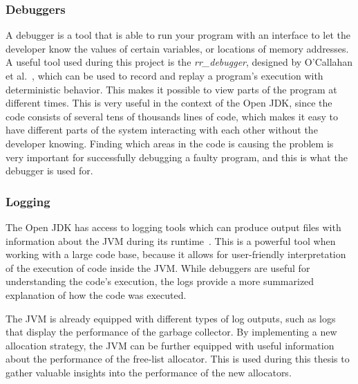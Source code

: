 \subsubsection{Debuggers}
A debugger is a tool that is able to run your program with an interface to let the developer know the values of certain variables, or locations of memory addresses. A useful tool used during this project is the \textit{rr\_debugger}, designed by O'Callahan et al.~\cite{rrdebugger}, which can be used to record and replay a program's execution with deterministic behavior. This makes it possible to view parts of the program at different times. This is very useful in the context of the Open JDK, since the code consists of several tens of thousands lines of code, which makes it easy to have different parts of the system interacting with each other without the developer knowing. Finding which areas in the code is causing the problem is very important for successfully debugging a faulty program, and this is what the debugger is used for.

\subsubsection{Logging}
The Open JDK has access to logging tools which can produce output files with information about the JVM during its runtime~\cite{https://inside.java/2022/11/07/sip071/}. This is a powerful tool when working with a large code base, because it allows for user-friendly interpretation of the execution of code inside the JVM. While debuggers are useful for understanding the code's execution, the logs provide a more summarized explanation of how the code was executed. 

The JVM is already equipped with different types of log outputs, such as logs that display the performance of the garbage collector. By implementing a new allocation strategy, the JVM can be further equipped with useful information about the performance of the free-list allocator. This is used during this thesis to gather valuable insights into the performance of the new allocators.